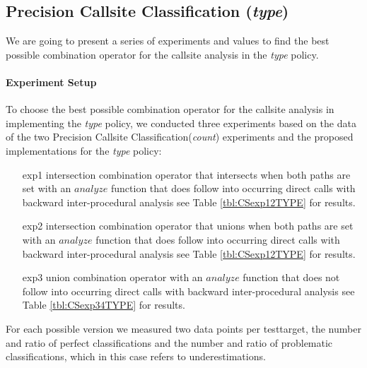 %	
%
%
%
\newpage
\subsection{Precision Callsite Classification (\textit{type})}
\label{subsection:typeshieldprecision}
We are going to present a series of experiments and values to find the best possible combination operator for the callsite analysis in the \textit{type} policy.

\paragraph{Experiment Setup}
To choose the best possible combination operator for the callsite analysis in implementing the \textit{type} policy, we conducted three  experiments based on the data of the two Precision Callsite Classification(\textit{count}) experiments and the proposed implementations for the \textit{type} policy:
\begin{enumerate}
\item[exp1] intersection combination operator that intersects when both paths are set with an $analyze$ function that does follow into occurring direct calls with backward inter-procedural analysis see Table \ref{tbl:CSexp12TYPE} for results.

\item[exp2] intersection combination operator that unions when both paths are set with an $analyze$ function that does follow into occurring direct calls  with backward inter-procedural analysis  see Table \ref{tbl:CSexp12TYPE} for results.

\item[exp3] union combination operator with an $analyze$ function that does not follow into occurring direct calls  with backward inter-procedural analysis  see Table \ref{tbl:CSexp34TYPE} for results.

\end{enumerate}
For each possible version we measured two data points per testtarget, the number and ratio of perfect classifications and the number and ratio of problematic classifications, which in this case refers to underestimations.

